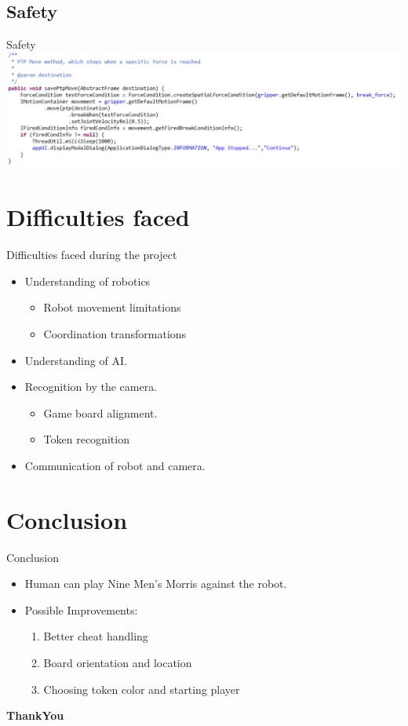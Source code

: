 \documentclass{beamer}
\begin{document}
\subsection{Safety}
\begin{frame}{Safety}
\includegraphics[width=20cm,angle=0]{imgs/safety.png}

\end{frame}


\section{Difficulties faced}
\begin{frame}{Difficulties faced during the project}
\begin{itemize}
\item Understanding of robotics
\begin{itemize}
\item Robot movement limitations
\item Coordination transformations
\end{itemize}
\item Understanding of AI.
\item Recognition by the camera.
\begin{itemize}
\item Game board alignment.
\item Token recognition
\end{itemize}
\item Communication of robot and camera.
\end{itemize}
\end{frame}


\section{Conclusion}
\begin{frame}{Conclusion}
\begin{itemize}
\item Human can play Nine Men's Morris against the robot.
\item Possible Improvements:
\begin{enumerate}
\item Better cheat handling
\item Board orientation and location
\item Choosing token color and starting player
\end{enumerate}
\end{itemize}
\end{frame}


\begin{frame}
\begin{center}  
\Huge \textbf{ThankYou}
\end{center}
\end{frame}
\end{document}
